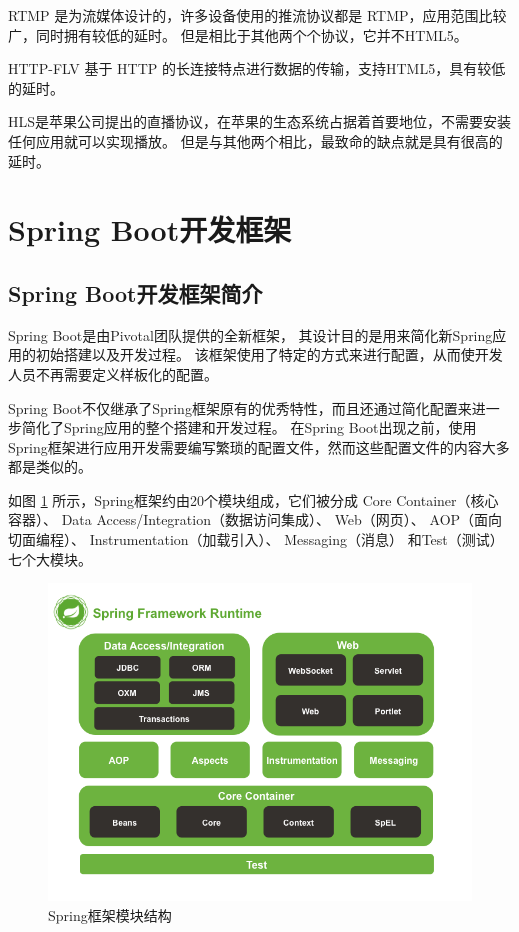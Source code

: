 RTMP 是为流媒体设计的，许多设备使用的推流协议都是 RTMP，应用范围比较广，同时拥有较低的延时。
但是相比于其他两个个协议，它并不HTML5。

HTTP-FLV 基于 HTTP 的长连接特点进行数据的传输，支持HTML5，具有较低的延时。


HLS是苹果公司提出的直播协议，在苹果的生态系统占据着首要地位，不需要安装任何应用就可以实现播放。
但是与其他两个相比，最致命的缺点就是具有很高的延时。
\section{Spring Boot开发框架}
\subsection{Spring Boot开发框架简介}
Spring Boot是由Pivotal团队提供的全新框架，
其设计目的是用来简化新Spring应用的初始搭建以及开发过程。
该框架使用了特定的方式来进行配置，从而使开发人员不再需要定义样板化的配置。


Spring Boot不仅继承了Spring框架原有的优秀特性，而且还通过简化配置来进一步简化了Spring应用的整个搭建和开发过程。
在Spring Boot出现之前，使用Spring框架进行应用开发需要编写繁琐的配置文件，然而这些配置文件的内容大多都是类似的。

如图 \ref{Fig:spring} 所示，Spring框架约由20个模块组成，它们被分成
Core Container（核心容器）、
Data Access/Integration（数据访问集成）、
Web（网页）、
AOP（面向切面编程）、
Instrumentation（加载引入）、
Messaging（消息）
和Test（测试）七个大模块。

\begin{figure}[ht]
    \centering
    \includegraphics[width=0.8\linewidth]{./Figure/IMG_spring.png}
    \caption{Spring框架模块结构}
    \label{Fig:spring}
\end{figure}

